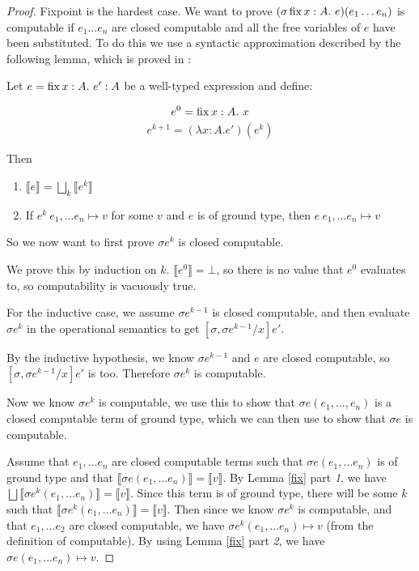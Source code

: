 \begin{proof}
Fixpoint is the hardest case. We want to prove $(\sigma \operatorname{fix} x:A. \ e)(e_1 \dots e_n)$ is computable if $e_1 \dots e_n$ are closed computable and all the free variables of $e$ have been substituted. To do this we use a syntactic approximation described by the following lemma, which is proved in \citep{Gunter92} :

\begin{lem}\label{fix}
Let $e = \operatorname{fix} x : A. \ e' : A$ be a well-typed expression and define:

\[e^0 = \operatorname{fix} x : A. \ x \]
\[ e^{k+1} = (\lambda x : A. e')(e^k) \]

Then 

\begin{enumerate}
\item{$\llbracket e \rrbracket = \bigsqcup_k \llbracket e^k \rrbracket$}
\item{If $e^k \ e_1, \dots e_n \mapsto v$ for some $v$ and $e$ is of ground type, then $e \ e_1, \dots e_n \mapsto v$} 
\end{enumerate}  
\end{lem}

So we now want to first prove $\sigma e^k$ is closed computable.

We prove this by induction on $k$. $\llbracket e^0 \rrbracket = \bot$, so there is no value that $e^0$ evaluates to, so computability is vacuously true.

For the inductive case, we assume $\sigma e^{k-1}$ is closed computable, and then evaluate $\sigma e^k$ in the operational semantics to get $[\sigma, \sigma e^{k-1}/x]e'$.

By the inductive hypothesis, we know $\sigma  e^{k-1}$ and $e$ are closed computable, so    $[\sigma, \sigma e^{k-1}/x]e'$ is too. Therefore $\sigma e^k$ is computable.

Now we know $\sigma e^k$ is computable, we use this to  show that $\sigma e (e_1, \dots, e_n)$ is a closed computable term of ground type, which we can then use to show that $\sigma e$ is computable.

Assume that $e_1, \dots e_n$ are closed computable terms such that $\sigma e (e_1, \dots e_n)$ is of ground type and that $\llbracket \sigma e(e_1, \dots e_n) \rrbracket  = \llbracket v \rrbracket$. By Lemma \ref{fix} part \emph{1}, we have $\bigsqcup \llbracket \sigma e^k (e_1, \dots e_n) \rrbracket = \llbracket v \rrbracket$. Since this term is of ground type, there will be some $k$ such that $\llbracket \sigma e^k (e_1, \dots e_n) \rrbracket = \llbracket v \rrbracket$. Then since we know $\sigma e^k$ is computable, and that $e_1, \dots e_2$ are closed computable, we have $\sigma e^k (e_1, \dots e_n) \mapsto v$ (from the definition of computable). By using Lemma \ref{fix} part \emph{2}, we have $\sigma e (e_1, \dots e_n) \mapsto v$.


\end{proof}
